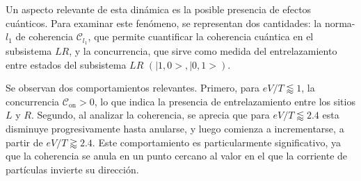 

Un aspecto relevante de esta dinámica es la posible presencia de efectos cuánticos. Para examinar este fenómeno, se representan dos cantidades: la norma-$l_{1}$ de coherencia \( \mathcal{C}_{l_{1}} \), que permite cuantificar la coherencia cuántica en el subsistema \( LR \), y la concurrencia, que sirve como medida del entrelazamiento entre estados del subsistema $LR$ $(|1,0>,|0,1>)$.


Se observan dos comportamientos relevantes. Primero, para \( eV/T \lessapprox 1 \), la concurrencia \( \mathcal{C}_{\text{on}} > 0 \), lo que indica la presencia de entrelazamiento entre los sitios \( L \) y \( R \). Segundo, al analizar la coherencia, se aprecia que para \( eV/T \lessapprox 2.4 \) esta disminuye progresivamente hasta anularse, y luego comienza a incrementarse, a partir de \( eV/T \gtrapprox 2.4 \). Este comportamiento es particularmente significativo, ya que la coherencia se anula en un punto cercano al valor en el que la corriente de partículas invierte su dirección. 


